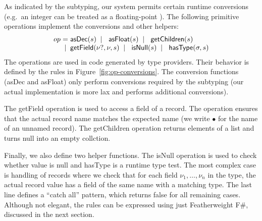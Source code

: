 \documentclass[10pt,preprint,blind,clearpagebib]{sigplanconf}
\newcommand{\kvd}[1]{\textnormal{\textcolor{kvdclr}{\sffamily #1}}}
\newcommand{\num}[1]{\textnormal{\textcolor{numclr}{\sffamily #1}}}
\newcommand{\ident}[1]{\textnormal{\sffamily #1}}
\newcommand{\lsep}[0]{\;\; | \;\;}
\newcommand{\narrow}[1]{\hspace{-0.7em} #1 \hspace{-0.7em}}
\begin{document}
As indicated by the subtyping, our system permits certain runtime conversions (e.g.~an integer
\num{1} can be treated as a floating-point \num{1.0}). The following primitive operations 
implement the conversions and other helpers:
%
\begin{equation*}
\begin{array}{lcl}
 op  &\narrow{=}& \ident{asDec}(s) \lsep \ident{asFloat}(s) \lsep \ident{getChildren}(s) \\
     &\narrow{|}& \ident{getField}(\nu?, \nu, s) \lsep \ident{isNull}(s) \lsep \ident{hasType}(\sigma, s)
\end{array}
\end{equation*}
%
The operations are used in code generated by type providers. Their behavior is defined
by the rules in Figure~\ref{fig:op-conversions}. The conversion functions (\ident{asDec}
and \ident{asFloat}) only perform conversions required by the subtyping (our actual 
implementation is more lax and performs additional conversions).

The \ident{getField} operation is used to access a field of a record. The operation ensures that
the actual record name matches the expected name (we write $\bullet$ for the name of an unnamed 
record). The \ident{getChildren} operation returns elements of a list and turns \kvd{null} into 
an empty collction.

Finally, we also define two helper functions. The \ident{isNull} operation is used to check whether 
value is \kvd{null} and \ident{hasType} is a runtime type test. The most complex case is handling 
of records where we check that for each field $\nu_1, \ldots, \nu_n$ in the type, the actual record 
value has a field of the same name with a matching type. The last line defines a ``catch all'' 
pattern, which returns \kvd{false} for all remaining cases. Although not elegant, the rules 
can be expressed using just Featherweight F\#, discussed in the next section.

\end{document}
